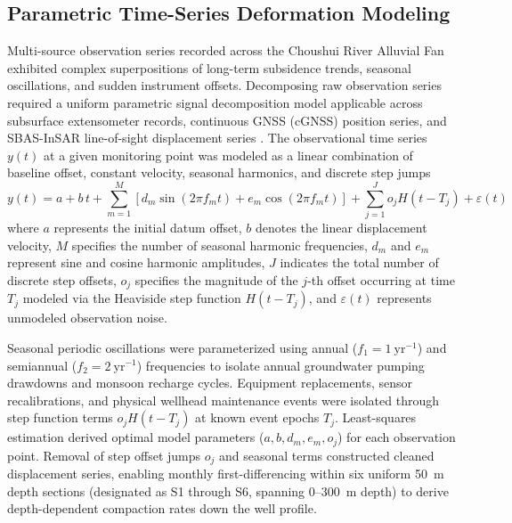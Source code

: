 
\subsection{Parametric Time-Series Deformation Modeling}
\label{subsec:parametric_deformation}

Multi-source observation series recorded across the Choushui River Alluvial Fan exhibited complex superpositions of long-term subsidence trends, seasonal oscillations, and sudden instrument offsets. Decomposing raw observation series required a uniform parametric signal decomposition model applicable across subsurface extensometer records, continuous GNSS (cGNSS) position series, and SBAS-InSAR line-of-sight displacement series \citep{hung_exploring_2024}. The observational time series $y(t)$ at a given monitoring point was modeled as a linear combination of baseline offset, constant velocity, seasonal harmonics, and discrete step jumps \citep{nikolaidis_observation_2002}
\begin{equation}
y(t) = a + b \, t + \sum_{m=1}^{M} \left[ d_m \sin\left(2\pi f_m t\right) + e_m \cos\left(2\pi f_m t\right) \right] + \sum_{j=1}^{J} o_j H(t - T_j) + \varepsilon(t)
\label{eq:parametric_deformation}
\end{equation}
where $a$ represents the initial datum offset, $b$ denotes the linear displacement velocity, $M$ specifies the number of seasonal harmonic frequencies, $d_m$ and $e_m$ represent sine and cosine harmonic amplitudes, $J$ indicates the total number of discrete step offsets, $o_j$ specifies the magnitude of the $j$-th offset occurring at time $T_j$ modeled via the Heaviside step function $H(t - T_j)$, and $\varepsilon(t)$ represents unmodeled observation noise.

Seasonal periodic oscillations were parameterized using annual ($f_1 = 1~\text{yr}^{-1}$) and semiannual ($f_2 = 2~\text{yr}^{-1}$) frequencies to isolate annual groundwater pumping drawdowns and monsoon recharge cycles. Equipment replacements, sensor recalibrations, and physical wellhead maintenance events were isolated through step function terms $o_j H(t - T_j)$ at known event epochs $T_j$. Least-squares estimation derived optimal model parameters ($a, b, d_m, e_m, o_j$) for each observation point. Removal of step offset jumps $o_j$ and seasonal terms constructed cleaned displacement series, enabling monthly first-differencing within six uniform 50~m depth sections (designated as S1 through S6, spanning 0--300~m depth) to derive depth-dependent compaction rates down the well profile.

